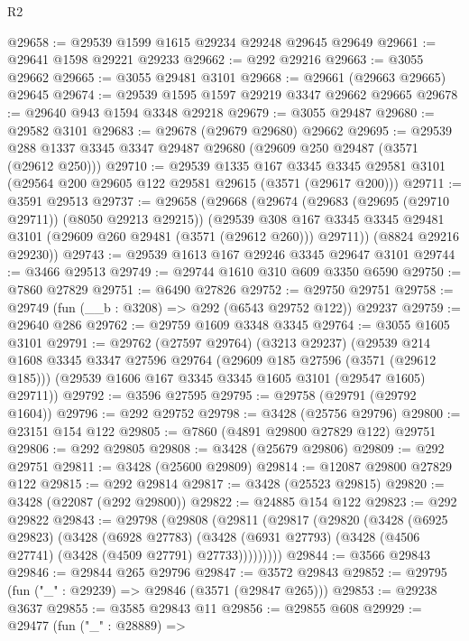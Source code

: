 \begin{lexlean}{R2}
\begin{coremodule}
@29658 := @29539 @1599 @1615 @29234 @29248 @29645 @29649
@29661 := @29641 @1598 @29221 @29233
@29662 := @292 @29216
@29663 := @3055 @29662
@29665 := @3055 @29481 @3101
@29668 := @29661 (@29663 @29665) @29645
@29674 := @29539 @1595 @1597 @29219 @3347 @29662 @29665
@29678 := @29640 @943 @1594 @3348 @29218
@29679 := @3055 @29487
@29680 := @29582 @3101
@29683 := @29678 (@29679 @29680) @29662
@29695 := @29539 @288 @1337 @3345 @3347 @29487 @29680 (@29609 @250 @29487 (@3571 (@29612 @250)))
@29710 := @29539
    @1335
    @167
    @3345
    @3345
    @29581
    @3101
    (@29564 @200 @29605 @122 @29581 @29615 (@3571 (@29617 @200)))
@29711 := @3591 @29513
@29737 := @29658
    (@29668
      (@29674
        (@29683 (@29695 (@29710 @29711)) (@8050 @29213 @29215))
        (@29539
          @308
          @167
          @3345
          @3345
          @29481
          @3101
          (@29609 @260 @29481 (@3571 (@29612 @260)))
          @29711))
      (@8824 @29216 @29230))
@29743 := @29539 @1613 @167 @29246 @3345 @29647 @3101
@29744 := @3466 @29513
@29749 := @29744 @1610 @310 @609 @3350 @6590
@29750 := @7860 @27829
@29751 := @6490 @27826
@29752 := @29750 @29751
@29758 := @29749 (fun (__b : @3208) => @292 (@6543 @29752 @122)) @29237
@29759 := @29640 @286
@29762 := @29759 @1609 @3348 @3345
@29764 := @3055 @1605 @3101
@29791 := @29762
    (@27597 @29764)
    (@3213 @29237)
    (@29539
      @214
      @1608
      @3345
      @3347
      @27596
      @29764
      (@29609 @185 @27596 (@3571 (@29612 @185)))
      (@29539 @1606 @167 @3345 @3345 @1605 @3101 (@29547 @1605) @29711))
@29792 := @3596 @27595
@29795 := @29758 (@29791 (@29792 @1604))
@29796 := @292 @29752
@29798 := @3428 (@25756 @29796)
@29800 := @23151 @154 @122
@29805 := @7860 (@4891 @29800 @27829 @122) @29751
@29806 := @292 @29805
@29808 := @3428 (@25679 @29806)
@29809 := @292 @29751
@29811 := @3428 (@25600 @29809)
@29814 := @12087 @29800 @27829 @122
@29815 := @292 @29814
@29817 := @3428 (@25523 @29815)
@29820 := @3428 (@22087 (@292 @29800))
@29822 := @24885 @154 @122
@29823 := @292 @29822
@29843 := @29798
    (@29808
      (@29811
        (@29817
          (@29820
            (@3428
              (@6925 @29823)
              (@3428
                (@6928 @27783)
                (@3428 (@6931 @27793) (@3428 (@4506 @27741) (@3428 (@4509 @27791) @27733)))))))))
@29844 := @3566 @29843
@29846 := @29844 @265 @29796
@29847 := @3572 @29843
@29852 := @29795 (fun ("_" : @29239) => @29846 (@3571 (@29847 @265)))
@29853 := @29238 @3637
@29855 := @3585 @29843 @11
@29856 := @29855 @608
@29929 := @29477
    (fun ("_" : @28889) =>

\end{coremodule}
\end{lexlean}
